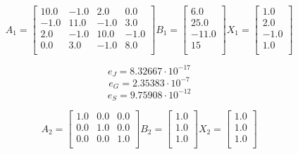 \documentclass{article}
\begin{document}
\[
A_1 =
\begin{bmatrix}
    10.0 & -1.0 & 2.0 & 0.0 \\
    -1.0 & 11.0 & -1.0 &  3.0 \\
    2.0 & -1.0 & 10.0 & -1.0 \\
    0.0 &  3.0 & -1.0 &  8.0 \\
\end{bmatrix}
B_1 = 
\begin{bmatrix}
     6.0 \\
    25.0 \\
    -11.0 \\
    15 \\
\end{bmatrix}
X_1 = 
\begin{bmatrix}
    1.0  \\
    2.0  \\
    -1.0 \\
    1.0  \\
\end{bmatrix}
\]
\noindent
{}

\[ e_J = 8.32667 \cdot 10^{-17} \]
\[ e_G = 2.35383 \cdot 10^{-7} \]
\[ e_S = 9.75908 \cdot 10^{-12} \]

\[
A_2 =
\begin{bmatrix}
    1.0 & 0.0 & 0.0 \\
    0.0 & 1.0 & 0.0 \\
    0.0 & 0.0 & 1.0 \\
\end{bmatrix}
B_2 = 
\begin{bmatrix}
    1.0 \\
    1.0 \\
    1.0 \\
\end{bmatrix}
X_2 = 
\begin{bmatrix}
    1.0 \\
    1.0 \\
    1.0 \\
\end{bmatrix}
\]
\noindent
{}
\end{document}
